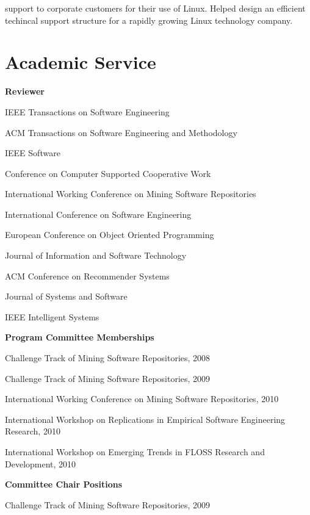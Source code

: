 \documentclass[margin,line,article]{res}
\newenvironment{list1}{
  \begin{list}{}{%
      \setlength{\itemsep}{0in}
      \setlength{\parsep}{0in} \setlength{\parskip}{0in}
      \setlength{\topsep}{0in} \setlength{\partopsep}{0in} 
      \setlength{\leftmargin}{0.17in}}}{\end{list}}
\begin{document}
\begin{resume}
\begin{list1}
support to corporate customers for their use of Linux. Helped design an efficient 
techincal support structure for a rapidly growing Linux technology company.
\end{list1}


\section{Academic \hspace{.2in} Service}
\textbf{Reviewer}
\begin{list1}
\item IEEE Transactions on Software Engineering
\item ACM Transactions on Software Engineering and Methodology
\item IEEE Software
\item Conference on Computer Supported Cooperative Work
\item International Working Conference on Mining Software Repositories
\item International Conference on Software Engineering
\item European Conference on Object Oriented Programming
\item Journal of Information and Software Technology
\item ACM Conference on Recommender Systems
\item Journal of Systems and Software 
\item IEEE Intelligent Systems
\end{list1}

\textbf{Program Committee Memberships}
\begin{list1}
\item Challenge Track of Mining Software Repositories, 2008
\item Challenge Track of Mining Software Repositories, 2009
\item International Working Conference on Mining Software Repositories, 2010
\item International Workshop on Replications in Empirical Software Engineering Research, 2010
\item International Workshop on Emerging Trends in FLOSS Research and Development, 2010
\end{list1}

\textbf{Committee Chair Positions}
\begin{list1}
\item Challenge Track of Mining Software Repositories, 2009
\end{list1}


\end{resume}
\end{document}
